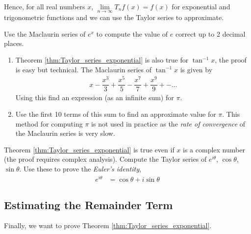 Hence, for all real numbers $x$, $\lim \limits_{n \rightarrow \infty}T_n f(x) = f(x)$ for exponential and trigonometric functions and we can use the Taylor series to approximate.

\begin{exercise}
  Use the Maclaurin series of $e^x$ to compute the value of $e$ correct up to 2 decimal places.
\end{exercise}

\begin{exercise}
  \begin{enumerate}
    \item Theorem \ref{thm:Taylor_series_exponential} is also true for $\tan^{-1} x$, the proof is easy but technical. The Maclaurin series of $\tan^{-1} x$ is given by
    \begin{align*}
      x - \dfrac{x^3}{3} + \dfrac{x^5}{5} - \dfrac{x^7}{7} + \dfrac{x^9}{9} + - \dots
    \end{align*}
    Using this find an expression (as an infinite sum) for $\pi$.
    \item Use the first 10 terms of this sum to find an approximate value for $\pi$.
    This method for computing $\pi$ is not used in practice as the \textit{rate of convergence} of the Maclaurin series is very slow.
  \end{enumerate}
\end{exercise}

\begin{exercise}
  Theorem \ref{thm:Taylor_series_exponential} is true even if $x$ is a complex number (the proof requires complex analysis).
  Compute the Taylor series of $e^{i\theta}$, $\cos \theta$, $\sin \theta$. Use these to prove the {\it Euler's identity},
\begin{align*}
    e^{i\theta} &= \cos \theta + i \sin \theta
\end{align*}
\end{exercise}



\subsection{Estimating the Remainder Term}
Finally, we  want to prove Theorem \ref{thm:Taylor_series_exponential}.

